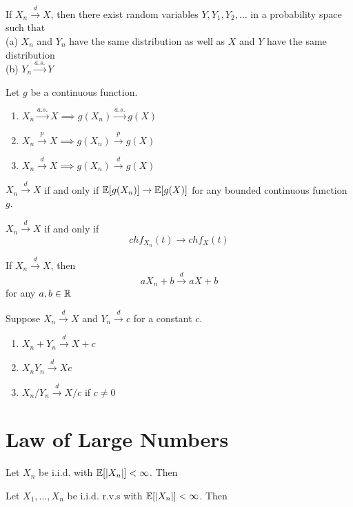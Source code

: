 \documentclass[11pt]{article}
\begin{document}
If $X_n \overset{d}{\longrightarrow} X$, then there exist random variables $Y, Y_1, Y_2, \hdots$ in a probability space such that \\
(a) $X_n$ and $Y_n$ have the same distribution as well as $X$ and $Y$ have the same distribution \\
(b) $Y_n \overset{a.s.}{\longrightarrow} Y$

Let $g$ be a continuous function.
\begin{enumerate}
	\item $X_n \overset{a.s.}{\longrightarrow} X \implies g(X_n) \overset{a.s.}{\longrightarrow} g(X)$
	\item $X_n \overset{p}{\longrightarrow} X \implies g(X_n) \overset{p}{\longrightarrow} g(X)$
	\item $X_n \overset{d}{\longrightarrow} X \implies g(X_n) \overset{d}{\longrightarrow} g(X)$
\end{enumerate}

\theorem
$X_n \overset{d}{\longrightarrow} X$ if and only if $\mathbb{E}[{g(X_n)}] \rightarrow \mathbb{E}[{g(X)}]$ for any bounded continuous function $g$.

\theorem
$X_n \overset{d}{\longrightarrow} X$ if and only if $$chf_{X_n}(t) \rightarrow chf_X(t)$$

\theorem
If $X_n \overset{d}{\longrightarrow} X$, then
$$aX_n + b \overset{d}{\longrightarrow} aX + b$$ for any $a,b \in \mathbb{R}$

Suppose $X_n \overset{d}{\longrightarrow} X$ and $Y_n \overset{d}{\longrightarrow} c$ for a constant $c$.
\begin{enumerate}
	\item $X_n + Y_n  \overset{d}{\longrightarrow} X + c$
	\item $X_nY_n  \overset{d}{\longrightarrow} Xc$
	\item $X_n/Y_n \overset{d}{\longrightarrow} X/c$ if $c \neq 0$
\end{enumerate}

\section{Law of Large Numbers}

Let $X_n$ be i.i.d. with $\mathbb{E}[{|X_n|}] < \infty$. Then 

Let $X_1, \hdots, X_n$ be i.i.d. r.v.s with $\mathbb{E}[{|X_n|}] < \infty$. Then 
\end{document}

